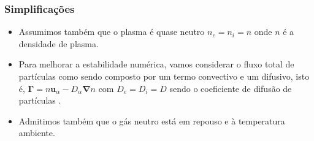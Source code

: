 \documentclass[aspectratio=169]{beamer}
\begin{document}
	\begin{frame}
		\frametitle{Simplificações}
		\begin{itemize}
	 
		\item Assumimos também que o plasma é quase neutro $n_e = n_i = n$ onde $n$ é a densidade de plasma. 
		\item Para melhorar a estabilidade numérica, vamos considerar o fluxo total de partículas como sendo composto por um termo convectivo e um difusivo, isto é, $\bm{\Gamma}=n\bm{u}_{\alpha}-D_{\alpha} \bm{\nabla} n$ com $D_e = D_i = D$ sendo o coeficiente de difusão de partículas \cite[pg. 52]{kim2013physics} \cite[cap 7]{thermalplasmas}.
		\item Admitimos também que o gás neutro está em repouso e à temperatura ambiente.
		\end{itemize}
		
		\end{frame}	
		
\end{document}
